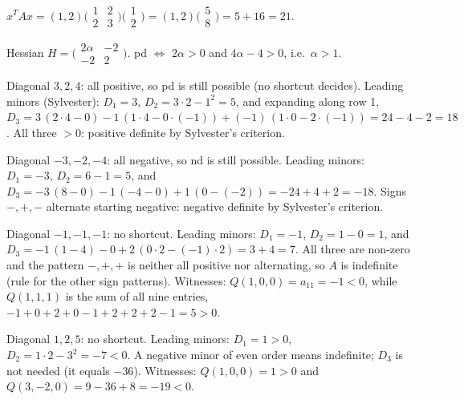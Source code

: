 \begin{solutions}
    \item $x^{T} A x = (1, 2)\bigl(\begin{smallmatrix} 1 & 2 \\ 2 & 3 \end{smallmatrix}\bigr)\bigl(\begin{smallmatrix} 1 \\ 2 \end{smallmatrix}\bigr) = (1, 2)\bigl(\begin{smallmatrix} 5 \\ 8 \end{smallmatrix}\bigr) = 5 + 16 = 21$.
    \item Hessian $H = \bigl(\begin{smallmatrix} 2 \alpha & -2 \\ -2 & 2 \end{smallmatrix}\bigr)$. pd $\Leftrightarrow$ $2 \alpha > 0$ and $4 \alpha - 4 > 0$, i.e.\ $\alpha > 1$.
    \item Diagonal $3, 2, 4$: all positive, so pd is still possible (no shortcut decides). Leading minors (Sylvester): $D_{1} = 3$, $D_{2} = 3 \cdot 2 - 1^{2} = 5$, and expanding along row 1,
          $D_{3} = 3\,(2 \cdot 4 - 0) - 1\,(1 \cdot 4 - 0 \cdot (-1)) + (-1)\,(1 \cdot 0 - 2 \cdot (-1)) = 24 - 4 - 2 = 18$.
          All three $> 0$: positive definite by Sylvester's criterion.
    \item Diagonal $-3, -2, -4$: all negative, so nd is still possible. Leading minors: $D_{1} = -3$, $D_{2} = 6 - 1 = 5$, and
          $D_{3} = -3\,(8 - 0) - 1\,(-4 - 0) + 1\,(0 - (-2)) = -24 + 4 + 2 = -18$.
          Signs $-, +, -$ alternate starting negative: negative definite by Sylvester's criterion.
    \item Diagonal $-1, -1, -1$: no shortcut. Leading minors: $D_{1} = -1$, $D_{2} = 1 - 0 = 1$, and
          $D_{3} = -1\,(1 - 4) - 0 + 2\,(0 \cdot 2 - (-1) \cdot 2) = 3 + 4 = 7$.
          All three are non-zero and the pattern $-, +, +$ is neither all positive nor alternating, so $A$ is indefinite (rule for the other sign patterns).
          Witnesses: $Q(1, 0, 0) = a_{11} = -1 < 0$, while $Q(1, 1, 1)$ is the sum of all nine entries, $-1 + 0 + 2 + 0 - 1 + 2 + 2 + 2 - 1 = 5 > 0$.
    \item Diagonal $1, 2, 5$: no shortcut. Leading minors: $D_{1} = 1 > 0$, $D_{2} = 1 \cdot 2 - 3^{2} = -7 < 0$. A negative minor of even order means indefinite; $D_{3}$ is not needed (it equals $-36$).
          Witnesses: $Q(1, 0, 0) = 1 > 0$ and $Q(3, -2, 0) = 9 - 36 + 8 = -19 < 0$.

\end{solutions}
